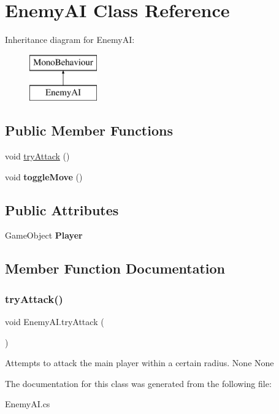 \hypertarget{class_enemy_a_i}{}\section{Enemy\+AI Class Reference}
\label{class_enemy_a_i}
Inheritance diagram for Enemy\+AI\+:\begin{figure}[H]
\begin{center}
\leavevmode
\includegraphics[height=2.000000cm]{class_enemy_a_i}
\end{center}
\end{figure}
\subsection*{Public Member Functions}
\begin{DoxyCompactItemize}
\item 
void \mbox{\hyperlink{class_enemy_a_i_aa199fde66aef59a3ca5898fefa699ca8}{try\+Attack}} ()
\item 
\mbox{\label{class_enemy_a_i_a6043590f1a68dee54de9e8f599cad88d}} 
void {\bfseries toggle\+Move} ()
\end{DoxyCompactItemize}
\subsection*{Public Attributes}
\begin{DoxyCompactItemize}
\item 
\mbox{\label{class_enemy_a_i_a415f57823bb4f2490f98bedb56ae6b49}} 
Game\+Object {\bfseries Player}
\end{DoxyCompactItemize}


\subsection{Member Function Documentation}
\mbox{\label{class_enemy_a_i_aa199fde66aef59a3ca5898fefa699ca8}} 
\subsubsection{\texorpdfstring{try\+Attack()}{tryAttack()}}
{\footnotesize\ttfamily void Enemy\+A\+I.\+try\+Attack (\begin{DoxyParamCaption}{ }\end{DoxyParamCaption})\hspace{0.3cm}{\ttfamily [inline]}}

Attempts to attack the main player within a certain radius.  None  None 

The documentation for this class was generated from the following file\+:\begin{DoxyCompactItemize}
\item 
Enemy\+A\+I.\+cs\end{DoxyCompactItemize}
